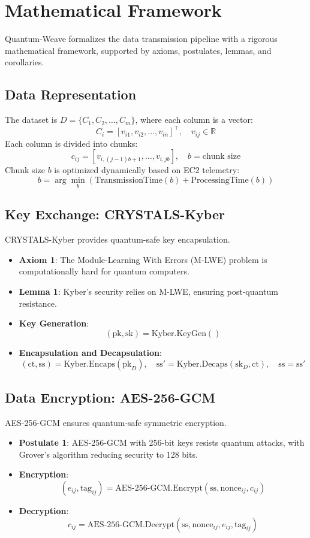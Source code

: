 \documentclass[12pt]{article}
\begin{document}
\section{Mathematical Framework}
Quantum-Weave formalizes the data transmission pipeline with a rigorous mathematical framework, supported by axioms, postulates, lemmas, and corollaries.

\subsection{Data Representation}
The dataset is \( D = \{C_1, C_2, \dots, C_m\} \), where each column is a vector:
\[
C_i = [v_{i1}, v_{i2}, \dots, v_{in}]^\top, \quad v_{ij} \in \mathbb{R}
\]
Each column is divided into chunks:
\[
c_{ij} = [v_{i,(j-1)b+1}, \dots, v_{i,jb}], \quad b = \text{chunk size}
\]
Chunk size \( b \) is optimized dynamically based on EC2 telemetry:
\[
b = \arg\min_b \left( \text{TransmissionTime}(b) + \text{ProcessingTime}(b) \right)
\]

\subsection{Key Exchange: CRYSTALS-Kyber}
CRYSTALS-Kyber provides quantum-safe key encapsulation.
\begin{itemize}
    \item \textbf{Axiom 1}: The Module-Learning With Errors (M-LWE) problem is computationally hard for quantum computers.
    \item \textbf{Lemma 1}: Kyber’s security relies on M-LWE, ensuring post-quantum resistance.
    \item \textbf{Key Generation}:
    \[
    (\text{pk}, \text{sk}) = \text{Kyber.KeyGen}()
    \]
    \item \textbf{Encapsulation and Decapsulation}:
    \[
    (\text{ct}, \text{ss}) = \text{Kyber.Encaps}(\text{pk}_D), \quad \text{ss}' = \text{Kyber.Decaps}(\text{sk}_D, \text{ct}), \quad \text{ss} = \text{ss}'
    \]
\end{itemize}

\subsection{Data Encryption: AES-256-GCM}
AES-256-GCM ensures quantum-safe symmetric encryption.
\begin{itemize}
    \item \textbf{Postulate 1}: AES-256-GCM with 256-bit keys resists quantum attacks, with Grover’s algorithm reducing security to 128 bits.
    \item \textbf{Encryption}:
    \[
    (e_{ij}, \text{tag}_{ij}) = \text{AES-256-GCM.Encrypt}(\text{ss}, \text{nonce}_{ij}, c_{ij})
    \]
    \item \textbf{Decryption}:
    \[
    c_{ij} = \text{AES-256-GCM.Decrypt}(\text{ss}, \text{nonce}_{ij}, e_{ij}, \text{tag}_{ij})
    \]
\end{itemize}
\end{document}
